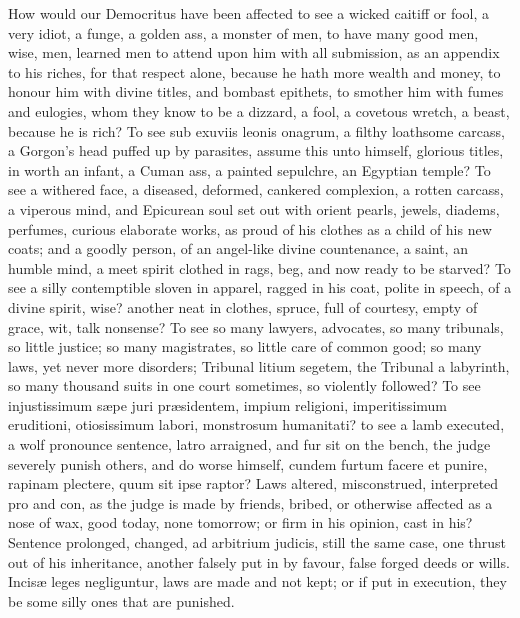 {How would our Democritus have been affected to see a wicked caitiff or
fool, a very idiot, a funge, a golden ass, a monster of men, to
have many good men, wise, men, learned men to attend upon him with all
submission, as an appendix to his riches, for that respect alone,
because he hath more wealth and money, to honour him with divine
titles, and bombast epithets, to smother him with fumes and eulogies,
whom they know to be a dizzard, a fool, a covetous wretch, a beast, \etc{}
because he is rich? To see sub exuviis leonis onagrum, a filthy
loathsome carcass, a Gorgon's head puffed up by parasites, assume this
unto himself, glorious titles, in worth an infant, a Cuman ass, a
painted sepulchre, an Egyptian temple? To see a withered face, a
diseased, deformed, cankered complexion, a rotten carcass, a viperous
mind, and Epicurean soul set out with orient pearls, jewels, diadems,
perfumes, curious elaborate works, as proud of his clothes as a child
of his new coats; and a goodly person, of an angel-like divine
countenance, a saint, an humble mind, a meet spirit clothed in rags,
beg, and now ready to be starved? To see a silly contemptible sloven in
apparel, ragged in his coat, polite in speech, of a divine spirit,
wise? another neat in clothes, spruce, full of courtesy, empty of
grace, wit, talk nonsense?
To see so many lawyers, advocates, so many tribunals, so little
justice; so many magistrates, so little care of common good; so many
laws, yet never more disorders; Tribunal litium segetem, the Tribunal a
labyrinth, so many thousand suits in one court sometimes, so violently
followed? To see injustissimum s\ae{}pe juri pr\ae{}sidentem, impium
religioni, imperitissimum eruditioni, otiosissimum labori, monstrosum
humanitati? to see a lamb executed, a wolf pronounce sentence,
latro arraigned, and fur sit on the bench, the judge severely punish
others, and do worse himself,  cundem furtum facere et punire,
rapinam plectere, quum sit ipse raptor? Laws altered,
misconstrued, interpreted pro and con, as the judge is made by
friends, bribed, or otherwise affected as a nose of wax, good today,
none tomorrow; or firm in his opinion, cast in his? Sentence prolonged,
changed, ad arbitrium judicis, still the same case, one thrust out
of his inheritance, another falsely put in by favour, false forged
deeds or wills. Incis\ae{} leges negliguntur, laws are made and not kept;
or if put in execution, they be some silly ones that are punished.

}
